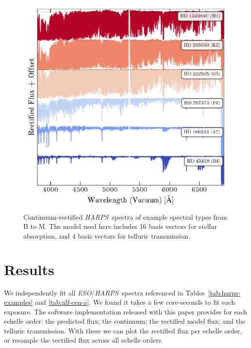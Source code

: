 \documentclass[modern]{aastex631}
\newcommand{\project}[1]{\textit{#1}}
\newcommand{\eso}{\project{ESO}}
\newcommand{\harps}{\project{HARPS}}
\begin{document}
\begin{figure}
    \includegraphics[width=\textwidth, height=\textwidth]{../code/harps_examples.pdf}
    \caption{Continuum-rectified \harps\ spectra of example spectral types from B to M. The model used here includes 16 basis vectors for stellar absorption, and 4 basis vectors for telluric transmission.\label{fig:harps-examples}}
\end{figure}


\section{Results} \label{sec:results}

We independently fit all \eso/\harps\ spectra referenced in Tables~\ref{tab:harps-examples} and \ref{tab:alf-cen-a}. We found it takes a few core-seconds to fit each exposure. The software implementation released with this paper provides for each echelle order: the predicted flux; the continuum; the rectified model flux; and the telluric transmission. With these we can plot the rectified flux per echelle order, or resample the rectified flux across all echelle orders.\\
\end{document}
